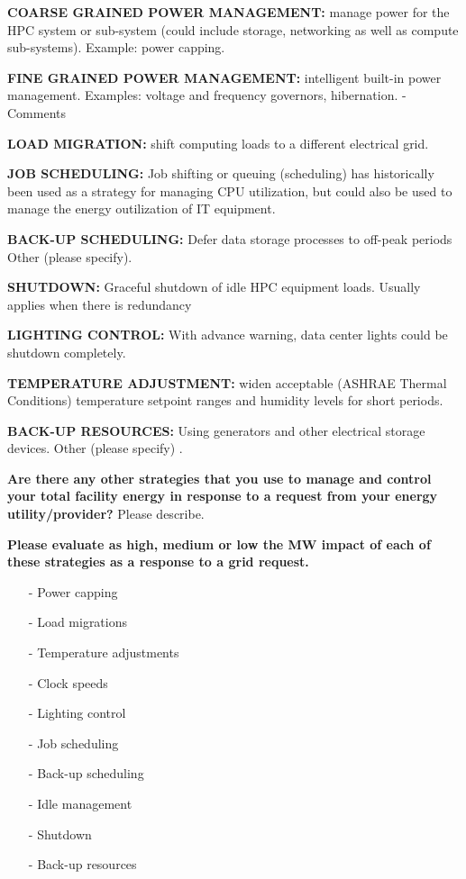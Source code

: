 \wl
\noindent
\textbf{COARSE GRAINED POWER MANAGEMENT:}  manage power for the HPC system or sub-system 
(could include storage, networking as well as compute sub-systems). 
Example: power capping. 

\wl
\noindent
\textbf{FINE GRAINED POWER MANAGEMENT:}  intelligent built-in power management.  
Examples: voltage and frequency governors, hibernation. - Comments	

\wl
\noindent
\textbf{LOAD MIGRATION:}  shift computing loads to a different electrical grid.   

\wl
\noindent
\textbf{JOB SCHEDULING:}  Job shifting or queuing (scheduling) has historically been used as a 
strategy for managing CPU utilization, but could also be used to manage the energy 
outilization of IT equipment. 

\wl
\noindent
\textbf{BACK-UP SCHEDULING:}  Defer data storage processes to off-peak periods  
Other (please specify).	

\wl
\noindent
\textbf{SHUTDOWN:} Graceful shutdown of idle HPC equipment loads. Usually applies when there is redundancy 

\wl
\noindent
\textbf{LIGHTING CONTROL:} With advance warning, data center lights could be shutdown completely. 

\wl
\noindent
\textbf{TEMPERATURE ADJUSTMENT:} widen acceptable (ASHRAE Thermal Conditions) temperature setpoint 
ranges and humidity levels for short periods.  

\wl
\noindent
\textbf{BACK-UP RESOURCES:}  Using generators and other electrical storage devices. 
Other (please specify)	.

\wl
\noindent
\textbf{Are there any other strategies that you use to manage and control your total facility 
energy in response to a request from your energy utility/provider?}
Please describe. 

\wl
\noindent
\textbf{Please evaluate as high, medium or low the MW impact of each of these strategies as a 
response to a grid request. }
\begin{itemize}
\item[{-}] Power capping	
\item[{-}] Load migrations	
\item[{-}] Temperature adjustments	
\item[{-}] Clock speeds	
\item[{-}] Lighting control	
\item[{-}] Job scheduling	
\item[{-}] Back-up scheduling	
\item[{-}] Idle management	
\item[{-}] Shutdown	
\item[{-}] Back-up resources	
\end{itemize}

